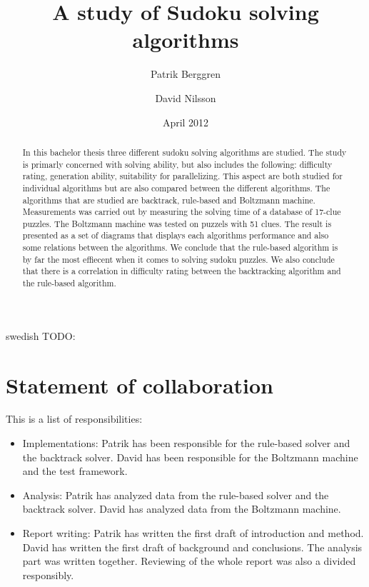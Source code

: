 \documentclass[a4paper,11pt]{kth-mag}
\title{A study of Sudoku solving algorithms}
\subtitle{}
\author{Patrik Berggren \and David Nilsson}
\date{April 2012}
\begin{document}
\frontmatter
\pagestyle{empty}
\removepagenumbers
\maketitle
{}
\begin{abstract}
In this bachelor thesis three different sudoku solving algorithms are studied.
The study is primarly concerned with solving ability, but also includes the following: difficulty rating, generation ability, suitability for parallelizing.
This aspect are both studied for individual algorithms but are also compared between the different algorithms.
The algorithms that are studied are backtrack, rule-based and Boltzmann machine.
Measurements was carried out by measuring the solving time of a database of 17-clue puzzles. The Boltzmann machine was tested on puzzels with 51 clues.
The result is presented as a set of diagrams that displays each algorithms performance and also some relations between the algorithms. 
We conclude that the rule-based algorithm is by far the most effiecent when it comes to solving sudoku puzzles.
We also conclude that there is a correlation in difficulty rating between the backtracking algorithm and the rule-based algorithm.

\end{abstract}
\clearpage
\begin{foreignabstract}{swedish}
TODO: 
\end{foreignabstract}
\clearpage
\section{Statement of collaboration}
This is a list of responsibilities:
\begin{itemize}
    \item Implementations: Patrik has been responsible for the rule-based solver and the backtrack solver. David has been responsible for the Boltzmann machine and the test framework.
    \item Analysis: Patrik has analyzed data from the rule-based solver and the backtrack solver. David has analyzed data from the Boltzmann machine.
    \item Report writing: Patrik has written the first draft of introduction and method. David has written the first draft of background and conclusions. The analysis part was written together. Reviewing of the whole report was also a divided responsibly.
\end{itemize}
\end{document}
